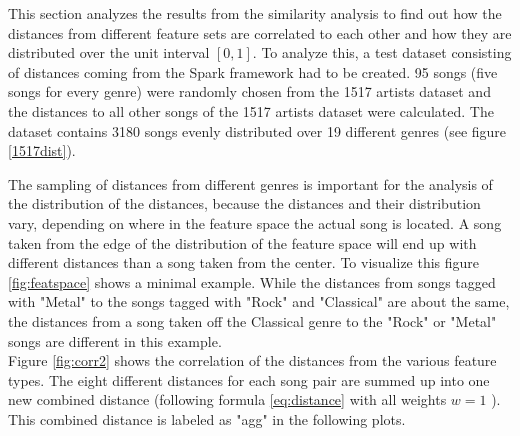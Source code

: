 This section analyzes the results from the similarity analysis to find out how the distances from different feature sets are correlated to each other and how they are distributed over the unit interval $[0,1]$.
\noindent To analyze this, a test dataset consisting of distances coming from the Spark framework had to be created. 95 songs (five songs for every genre) were randomly chosen from the 1517 artists dataset and the distances to all other songs of the 1517 artists dataset were calculated. The dataset contains 3180 songs evenly distributed over 19 different genres (see figure \ref{1517dist}).
\begin{figure}[htbp]
	\centering
\end{figure}%
\FloatBarrier

\noindent The sampling of distances from different genres is important for the analysis of the distribution of the distances, because the distances and their distribution vary, depending on where in the feature space the actual song is located. 
\noindent A song taken from the edge of the distribution of the feature space will end up with different distances than a song taken from the center. To visualize this figure \ref{fig:featspace} shows a minimal example. While the distances from songs tagged with "Metal" to the songs tagged with "Rock" and "Classical" are about the same, the distances from a song taken off the Classical genre to the "Rock" or "Metal" songs are different in this example.\\ 
\noindent Figure \ref{fig:corr2} shows the correlation of the distances from the various feature types. The eight different distances for each song pair are summed up into one new combined distance (following formula \ref{eq:distance} with all weights $w = 1$ ). This combined distance is labeled as "agg" in the following plots.

